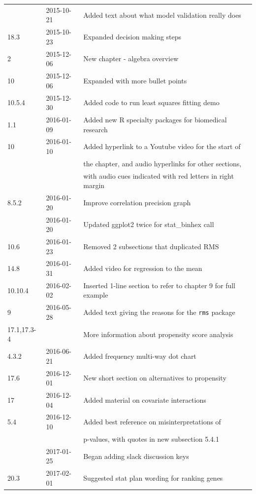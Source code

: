 \documentclass{report}
\newcommand{\co}[1]{\texttt{\smaller #1}}
\begin{document}
\begin{center}
\begin{tabular}{lll}
{9.11    & 2015-10-21 & Added text about what model validation really
                       does\\
18.3    & 2015-10-23 & Expanded decision making steps\\
2       & 2015-12-06 & New chapter - algebra overview\\
10      & 2015-12-06 & Expanded with more bullet points\\
10.5.4  & 2015-12-30 & Added code to run least squares fitting demo\\
1.1     & 2016-01-09 & Added new R specialty packages for biomedical research\\
10      & 2016-01-10 & Added hyperlink to a Youtube video for the start of\\
        &            & the chapter, and audio hyperlinks for other sections,\\
        &            & with audio cues indicated with red letters in
                       right margin\\
8.5.2   & 2016-01-20 & Improve correlation precision graph\\
        & 2016-01-20 & Updated ggplot2 twice for stat\_binhex call\\
10.6    & 2016-01-23 & Removed 2 subsections that duplicated RMS\\
14.8    & 2016-01-31 & Added video for regression to the mean\\
10.10.4 & 2016-02-02 & Inserted 1-line section to refer to chapter 9 for full example\\
9       & 2016-05-28 & Added text giving the reasons for the \co{rms} package\\
17.1,17.3-4    &            & More information about propensity score
                              analysis\\
4.3.2   & 2016-06-21 & Added frequency multi-way dot chart\\
17.6    & 2016-12-01 & New short section on alternatives to
                       propensity\\
17      & 2016-12-04 & Added material on covariate interactions\\
5.4     & 2016-12-10 & Added best reference on misinterpretations of\\
        &            & p-values, with quotes in new subsection 5.4.1\\ }
        & 2017-01-25 & Began adding slack discussion keys\\
20.3    & 2017-02-01 & Suggested stat plan wording for ranking genes\\

\end{tabular}
\end{center}
\end{document}
